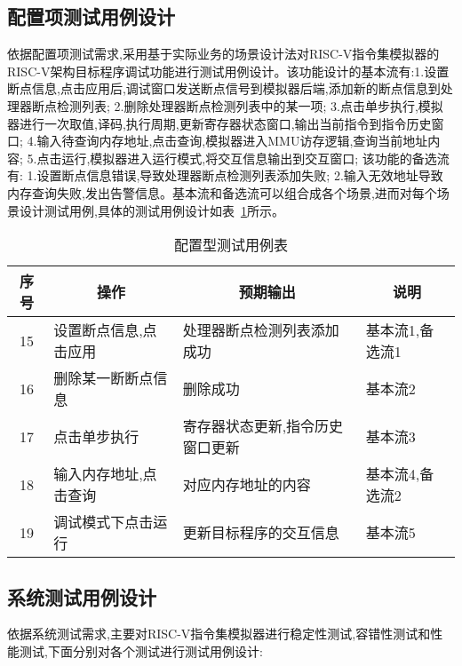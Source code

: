 \subsection{配置项测试用例设计}
依据配置项测试需求,采用基于实际业务的场景设计法对RISC-V指令集模拟器的RISC-V架构目标程序调试功能进行测试用例设计。该功能设计的基本流有:1.设置断点信息,点击应用后,调试窗口发送断点信号到模拟器后端,添加新的断点信息到处理器断点检测列表; 2.删除处理器断点检测列表中的某一项; 3.点击单步执行,模拟器进行一次取值,译码,执行周期,更新寄存器状态窗口,输出当前指令到指令历史窗口; 4.输入待查询内存地址,点击查询,模拟器进入MMU访存逻辑,查询当前地址内容; 5.点击运行,模拟器进入运行模式,将交互信息输出到交互窗口; 该功能的备选流有: 1.设置断点信息错误,导致处理器断点检测列表添加失败; 2.输入无效地址导致内存查询失败,发出告警信息。基本流和备选流可以组合成各个场景,进而对每个场景设计测试用例,具体的测试用例设计如表~\ref{tab:test5}所示。
\begin{table}[h]
    \centering
    \caption{配置型测试用例表}
    \label{tab:test5}
    \begin{tabular}{clll}
      \toprule
      \multicolumn{1}{c}{序号} & \multicolumn{1}{c}{操作} & \multicolumn{1}{c}{预期输出} &\multicolumn{1}{c}{说明}\\
      \midrule
  15	& \multicolumn{1}{m{3.5cm}}{设置断点信息,点击应用} & \multicolumn{1}{m{3.5cm}}{处理器断点检测列表添加成功} & \multicolumn{1}{m{3.5cm}}{基本流1,备选流1}\\
  \hline
  16	& \multicolumn{1}{m{3.5cm}}{删除某一断断点信息} & \multicolumn{1}{m{3.5cm}}{删除成功} & \multicolumn{1}{m{3.5cm}}{基本流2}\\
  \hline
  17	& \multicolumn{1}{m{3.5cm}}{点击单步执行} & \multicolumn{1}{m{3.5cm}}{寄存器状态更新,指令历史窗口更新} & \multicolumn{1}{m{3.5cm}}{基本流3}\\
  \hline
  18	& \multicolumn{1}{m{3.5cm}}{输入内存地址,点击查询} & \multicolumn{1}{m{3.5cm}}{对应内存地址的内容} & \multicolumn{1}{m{3.5cm}}{基本流4,备选流2}\\
  \hline
  19	& \multicolumn{1}{m{3.5cm}}{调试模式下点击运行} & \multicolumn{1}{m{3.5cm}}{更新目标程序的交互信息} & \multicolumn{1}{m{3.5cm}}{基本流5}\\
      \bottomrule
    \end{tabular}
\end{table}


\subsection{系统测试用例设计}
依据系统测试需求,主要对RISC-V指令集模拟器进行稳定性测试,容错性测试和性能测试,下面分别对各个测试进行测试用例设计:


